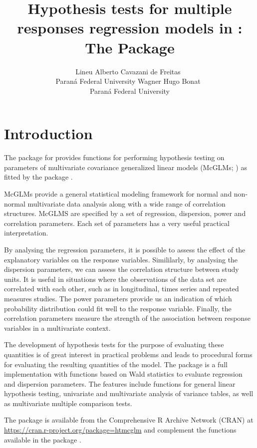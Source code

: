 \documentclass[article]{jss}\usepackage[]{graphicx}\usepackage[]{xcolor}
\author{Lineu Alberto Cavazani de Freitas~\orcidlink{0000-0002-0076-6642}\\Paraná Federal University
   \And Wagner Hugo Bonat~\orcidlink{0000-0002-0349-7054}\\Paraná Federal University}
\title{Hypothesis tests for multiple responses regression models in \proglang{R}: The \pkg{htmcglm} Package}
\begin{document}

\section{Introduction} \label{sec:intro}

The  package for  \citep{R2022} provides functions for performing hypothesis testing on parameters of multivariate covariance generalized linear models (McGLMs; \citet{Bonat16}) as fitted by the  package \citep{mcglm}. 

McGLMs provide a general statistical modeling framework for normal and non-normal multivariate data analysis along with a wide range of correlation structures. 
McGLMS are specified by a set of regression, dispersion, power and correlation parameters. Each set of parameters has a very useful practical interpretation.

By analysing the regression parameters, it is possible to assess the effect of the explanatory variables on the response variables. 
Simililarly, by analysing the dispersion parameters, we can assess the correlation structure between study units.
It is useful in situations where the observations of the data set are correlated with each other, such as in longitudinal, times series and repeated measures studies. 
The power parameters provide us an indication of which probability distribution could fit well to the response variable. Finally, the correlation parameters measure 
the strength of the association between response variables in a multivariate context.

The development of hypothesis tests for the purpose of evaluating these quantities is of great interest in practical problems and leads to procedural forms for evaluating the resulting quantities of the model. 
The  package is a full  implementation with functions based on Wald statistics to evaluate regression and dispersion parameters. 
The features include functions for general linear hypothesis testing, univariate and multivariate analysis of variance tables, as well as multivariate multiple comparison tests.

The  package is available from the Comprehensive R Archive Network (CRAN) at \href{https://cran.r-project.org/package=htmcglm}{https://cran.r-project.org/package=htmcglm} and complement the functions available in the  package \citep{mcglm}.
\end{document}
